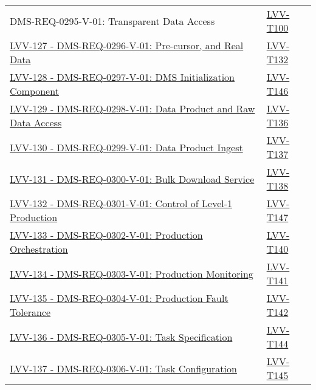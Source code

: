 \begin{longtable}[]{p{13cm}p{3cm}}
{DMS-REQ-0295-V-01: Transparent Data Access} &
\protect\hyperlink{lvv-t100---verify-implementation-of-transparent-data-access-dms-req-0295}{LVV-T100}\tabularnewline
\href{https://jira.lsstcorp.org/browse/LVV-127}{LVV-127 -
DMS-REQ-0296-V-01: Pre-cursor, and Real Data} &
\protect\hyperlink{lvv-t132---verify-implementation-of-pre-cursor-and-real-data-dms-req-0296}{LVV-T132}\tabularnewline
\href{https://jira.lsstcorp.org/browse/LVV-128}{LVV-128 -
DMS-REQ-0297-V-01: DMS Initialization Component} &
\protect\hyperlink{lvv-t146---verify-implementation-of-dms-initialization-component-dms-req-0297}{LVV-T146}\tabularnewline
\href{https://jira.lsstcorp.org/browse/LVV-129}{LVV-129 -
DMS-REQ-0298-V-01: Data Product and Raw Data Access} &
\protect\hyperlink{lvv-t136---verify-implementation-of-data-product-and-raw-data-access-dms-req-0298}{LVV-T136}\tabularnewline
\href{https://jira.lsstcorp.org/browse/LVV-130}{LVV-130 -
DMS-REQ-0299-V-01: Data Product Ingest} &
\protect\hyperlink{lvv-t137---verify-implementation-of-data-product-ingest-dms-req-0299}{LVV-T137}\tabularnewline
\href{https://jira.lsstcorp.org/browse/LVV-131}{LVV-131 -
DMS-REQ-0300-V-01: Bulk Download Service} &
\protect\hyperlink{lvv-t138---verify-implementation-bulk-download-service-dms-req-0300}{LVV-T138}\tabularnewline
\href{https://jira.lsstcorp.org/browse/LVV-132}{LVV-132 -
DMS-REQ-0301-V-01: Control of Level-1 Production} &
\protect\hyperlink{lvv-t147---verify-implementation-pof-control-of-level-1-production-dms-req-0301}{LVV-T147}\tabularnewline
\href{https://jira.lsstcorp.org/browse/LVV-133}{LVV-133 -
DMS-REQ-0302-V-01: Production Orchestration} &
\protect\hyperlink{lvv-t140---verify-implementation-of-production-orchestration--dms-req-0302}{LVV-T140}\tabularnewline
\href{https://jira.lsstcorp.org/browse/LVV-134}{LVV-134 -
DMS-REQ-0303-V-01: Production Monitoring} &
\protect\hyperlink{lvv-t141---verify-implementation-of-production-monitoring--dms-req-0303}{LVV-T141}\tabularnewline
\href{https://jira.lsstcorp.org/browse/LVV-135}{LVV-135 -
DMS-REQ-0304-V-01: Production Fault Tolerance} &
\protect\hyperlink{lvv-t142---verify-implementation-of-production-fault-tolerance-dms-req-0304}{LVV-T142}\tabularnewline
\href{https://jira.lsstcorp.org/browse/LVV-136}{LVV-136 -
DMS-REQ-0305-V-01: Task Specification} &
\protect\hyperlink{lvv-t144---verify-implementation-of-task-specification-dms-req-0305}{LVV-T144}\tabularnewline
\href{https://jira.lsstcorp.org/browse/LVV-137}{LVV-137 -
DMS-REQ-0306-V-01: Task Configuration} &
\protect\hyperlink{lvv-t145---verify-implementation-of-task-configuration-dms-req-0306}{LVV-T145}\tabularnewline

\end{longtable}
